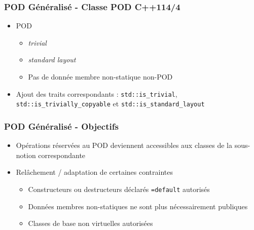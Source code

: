 \documentclass[C++.tex]{subfiles}
\begin{document}
\begin{frame}[fragile]
	\frametitle{POD Généralisé - Classe POD C++11\titlehfill{}4/4}
	\begin{itemize}
		\item POD
		\begin{itemize}
			\item \textit{trivial}
			\item \textit{standard layout}
			\item Pas de donnée membre non-statique non-POD
		\end{itemize}
		\item Ajout des traits correspondants : \lstinline|std::is_trivial|, \lstinline|std::is_trivially_copyable| et \lstinline|std::is_standard_layout|
	\end{itemize}
\end{frame}

\begin{frame}[fragile]
	\frametitle{POD Généralisé - Objectifs}
	\begin{itemize}
		\item Opérations réservées au POD deviennent accessibles aux classes de la sous-notion correspondante
		\item Relâchement / adaptation de certaines contraintes
		\begin{itemize}
			\item Constructeurs ou destructeurs déclarés \lstinline|=default| autorisés
			\item Données membres non-statiques ne sont plus nécessairement publiques


			\item Classes de base non virtuelles autorisées

		\end{itemize}
	\end{itemize}
\end{frame}
\end{document}
